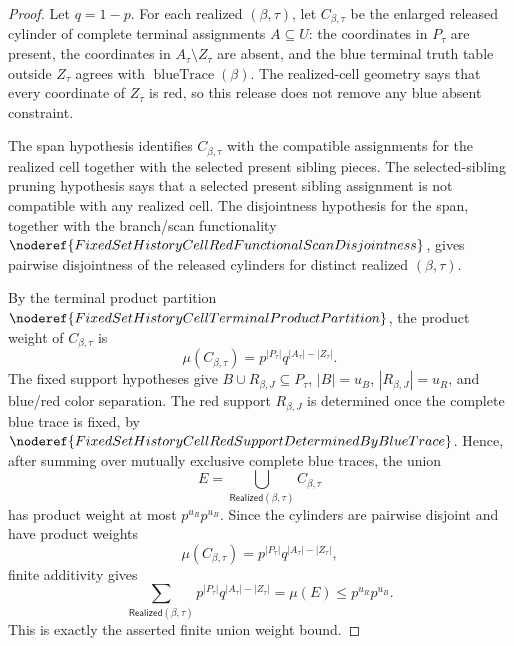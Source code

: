 \begin{proof}
Let \(q=1-p\).  For each realized \((\beta,\tau)\), let
\(C_{\beta,\tau}\) be the enlarged released cylinder of complete terminal
assignments \(A\subseteq U\): the coordinates in \(P_\tau\) are present, the
coordinates in \(A_\tau\setminus Z_\tau\) are absent, and the blue terminal
truth table outside \(Z_\tau\) agrees with
\(\operatorname{blueTrace}(\beta)\).  The realized-cell geometry says that
every coordinate of \(Z_\tau\) is red, so this release does not remove any
blue absent constraint.

The span hypothesis identifies \(C_{\beta,\tau}\) with the compatible
assignments for the realized cell together with the selected present sibling
pieces.  The selected-sibling pruning hypothesis says that a selected present
sibling assignment is not compatible with any realized cell.  The disjointness
hypothesis for the span, together with the branch/scan functionality
\(\noderef{FixedSetHistoryCellRedFunctionalScanDisjointness}\), gives
pairwise disjointness of the released cylinders for distinct realized
\((\beta,\tau)\).

By the terminal product partition
\(\noderef{FixedSetHistoryCellTerminalProductPartition}\), the product weight
of \(C_{\beta,\tau}\) is
\[
\mu(C_{\beta,\tau})
=p^{|P_\tau|}q^{|A_\tau|-|Z_\tau|}.
\]
The fixed support hypotheses give \(B\cup R_{\beta,J}\subseteq P_\tau\),
\(|B|=u_B\), \(|R_{\beta,J}|=u_R\), and blue/red color separation.  The red
support \(R_{\beta,J}\) is determined once the complete blue trace is fixed,
by \(\noderef{FixedSetHistoryCellRedSupportDeterminedByBlueTrace}\).  Hence,
after summing over mutually exclusive complete blue traces, the union
\[
E=\bigcup_{\mathsf{Realized}(\beta,\tau)} C_{\beta,\tau}
\]
has product weight at most \(p^{u_R}p^{u_B}\).
Since the cylinders are pairwise disjoint and have product weights
\[
\mu(C_{\beta,\tau})
=p^{|P_\tau|}q^{|A_\tau|-|Z_\tau|},
\]
finite additivity gives
\[
\sum_{\mathsf{Realized}(\beta,\tau)}
  p^{|P_\tau|}q^{|A_\tau|-|Z_\tau|}
=\mu(E)\le p^{u_R}p^{u_B}.
\]
This is exactly the asserted finite union weight bound.
\end{proof}
